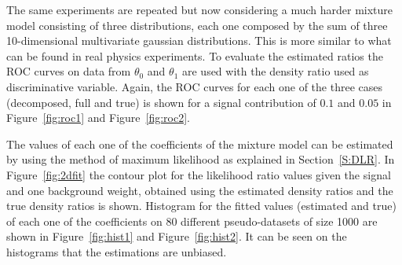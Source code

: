 \documentclass[a4paper]{jpconf}
\begin{document}
The same experiments are repeated but now considering a much harder mixture model consisting of three distributions, each one composed by the sum of three 10-dimensional multivariate gaussian distributions. This is more similar to what can be found in real physics experiments. To evaluate the estimated ratios the ROC curves on data from $\theta_0$ and $\theta_1$ are used with the density ratio used as discriminative variable. Again, the ROC curves for each one of the three cases (decomposed, full and true) is shown for a signal contribution of $0.1$ and $0.05$ in Figure~\ref{fig:roc1} and Figure~\ref{fig:roc2}.



The values of each one of the coefficients of the mixture model can be estimated by using the method of maximum likelihood as explained in Section~\ref{S:DLR}. In Figure~\ref{fig:2dfit} the contour plot for the likelihood ratio values given the signal and one background weight, obtained using the estimated density ratios and the true density ratios is shown. Histogram for the fitted values (estimated and true) of each one of the coefficients on 80 different pseudo-datasets of size 1000 are shown in Figure~\ref{fig:hist1} and Figure~\ref{fig:hist2}. It can be seen on the histograms that the estimations are unbiased.
\end{document}
